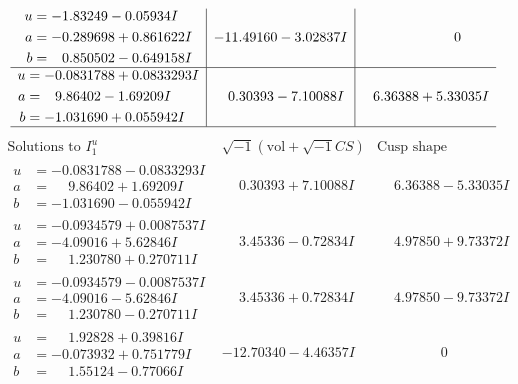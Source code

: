 \documentclass[1p]{elsarticle_modified}
\theoremstyle{definition}
\newcommand{\I}{\sqrt{-1}}
\begin{document}
$$\begin{array}{c|c|c}
\begin{aligned}
u &= -1.83249 - 0.05934 I \\
a &= -0.289698 + 0.861622 I \\
b &= \phantom{-}0.850502 - 0.649158 I\end{aligned}
 & -11.49160 - 3.02837 I & \phantom{-0.000000 } 0 \\ \hline\begin{aligned}
u &= -0.0831788 + 0.0833293 I \\
a &= \phantom{-}9.86402 - 1.69209 I \\
b &= -1.031690 + 0.055942 I\end{aligned}
 & \phantom{-}0.30393 - 7.10088 I & \phantom{-}6.36388 + 5.33035 I\\
 \hline 
 \end{array}$$\newpage$$\begin{array}{c|c|c}  
\text{Solutions to }I^u_{1}& \I (\text{vol} + \sqrt{-1}CS) & \text{Cusp shape}\\
 \hline 
\begin{aligned}
u &= -0.0831788 - 0.0833293 I \\
a &= \phantom{-}9.86402 + 1.69209 I \\
b &= -1.031690 - 0.055942 I\end{aligned}
 & \phantom{-}0.30393 + 7.10088 I & \phantom{-}6.36388 - 5.33035 I \\ \hline\begin{aligned}
u &= -0.0934579 + 0.0087537 I \\
a &= -4.09016 + 5.62846 I \\
b &= \phantom{-}1.230780 + 0.270711 I\end{aligned}
 & \phantom{-}3.45336 - 0.72834 I & \phantom{-}4.97850 + 9.73372 I \\ \hline\begin{aligned}
u &= -0.0934579 - 0.0087537 I \\
a &= -4.09016 - 5.62846 I \\
b &= \phantom{-}1.230780 - 0.270711 I\end{aligned}
 & \phantom{-}3.45336 + 0.72834 I & \phantom{-}4.97850 - 9.73372 I \\ \hline\begin{aligned}
u &= \phantom{-}1.92828 + 0.39816 I \\
a &= -0.073932 + 0.751779 I \\
b &= \phantom{-}1.55124 - 0.77066 I\end{aligned}
 & -12.70340 - 4.46357 I & \phantom{-0.000000 } 0 \\ \hline\begin{aligned}

\end{aligned}
\end{array}$$
\end{document}
